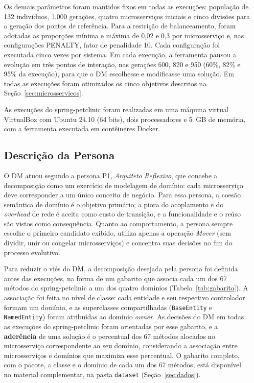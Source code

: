 \documentclass[conference]{IEEEtran}
\begin{document}
Os demais parâmetros foram mantidos fixos em todas as execuções: população de 132 indivíduos, 1.000 gerações, quatro microsserviços iniciais e cinco divisões para a geração dos pontos de referência. Para a restrição de balanceamento, foram adotadas as proporções mínima e máxima de 0,02 e 0,3 por microsserviço e, nas configurações PENALTY, fator de penalidade 10. Cada configuração foi executada cinco vezes por sistema. Em cada execução, a ferramenta pausou a evolução em três pontos de interação, nas gerações 600, 820 e 950 (60\%, 82\% e 95\% da execução), para que o DM escolhesse e modificasse uma solução. Em todas as execuções foram otimizados os cinco objetivos descritos na Seção~\ref{sec:microsservicos}.

As execuções do spring-petclinic foram realizadas em uma máquina virtual VirtualBox com Ubuntu 24.10 (64 bits), dois processadores e 5~GB de memória, com a ferramenta executada em contêineres Docker.

\subsection{Descrição da Persona}\label{sec:persona}

O DM atuou segundo a persona P1, \textit{Arquiteto Reflexivo}, que concebe a decomposição como um exercício de modelagem de domínio: cada microsserviço deve corresponder a um único conceito de negócio. Para essa persona, a coesão semântica de domínio é o objetivo primário; a piora do acoplamento e do \textit{overhead} de rede é aceita como custo de transição, e a funcionalidade e o reúso são vistos como consequência. Quanto ao comportamento, a persona sempre escolhe o primeiro candidato exibido, utiliza apenas a operação \textit{Mover} (sem dividir, unir ou congelar microsserviços) e concentra suas decisões no fim do processo evolutivo.

Para reduzir o viés do DM, a decomposição desejada pela persona foi definida antes das execuções, na forma de um gabarito que associa cada um dos 67 métodos do spring-petclinic a um dos quatro domínios (Tabela~\ref{tab:gabarito}). A associação foi feita no nível de classe: cada entidade e seu respectivo controlador formam um domínio, e as superclasses compartilhadas (\texttt{BaseEntity} e \texttt{NamedEntity}) foram atribuídas ao domínio \textit{owner}. As decisões do DM em todas as execuções do spring-petclinic foram orientadas por esse gabarito, e a \textbf{aderência} de uma solução é o percentual dos 67 métodos alocados no microsserviço correspondente ao seu domínio, considerando a associação entre microsserviços e domínios que maximiza esse percentual. O gabarito completo, com o pacote, a classe e o domínio de cada um dos 67 métodos, está disponível no material complementar, na pasta \texttt{dataset} (Seção~\ref{sec:dados}).
\end{document}
